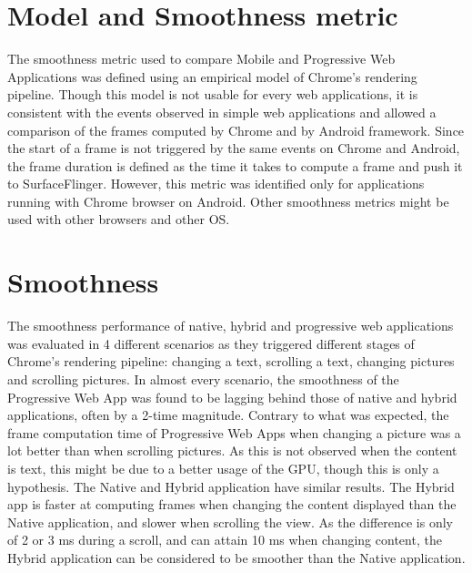 \documentclass{kththesis}
\begin{document}
\section{Model and Smoothness metric}
The smoothness metric used to compare Mobile and Progressive Web Applications was defined using an empirical model of Chrome's rendering pipeline. Though this model is not usable for every web applications, it is consistent with the events observed in simple web applications and allowed a comparison of the frames computed by Chrome and by Android framework. Since the start of a frame is not triggered by the same events on Chrome and Android, the frame duration is defined as the time it takes to compute a frame and push it to SurfaceFlinger. However, this metric was identified only for applications running with Chrome browser on Android. Other smoothness metrics might be used with other browsers and other OS. 

\section{Smoothness}
The smoothness performance of native, hybrid and progressive web applications was evaluated in 4 different scenarios as they triggered different stages of Chrome's rendering pipeline: changing a text, scrolling a text, changing pictures and scrolling pictures. In almost every scenario, the smoothness of the Progressive Web App was found to be lagging behind those of native and hybrid applications, often by a 2-time magnitude.\newline
Contrary to what was expected, the frame computation time of Progressive Web Apps when changing a picture was a lot better than when scrolling pictures. As this is not observed when the content is text, this might be due to a better usage of the GPU, though this is only a hypothesis. \newline
The Native and Hybrid application have similar results. The Hybrid app is faster at computing frames when changing the content displayed than the Native application, and slower when scrolling the view. As the difference is only of 2 or 3 ms during a scroll, and can attain 10 ms when changing content, the Hybrid application can be considered to be smoother than the Native application.
\end{document}
